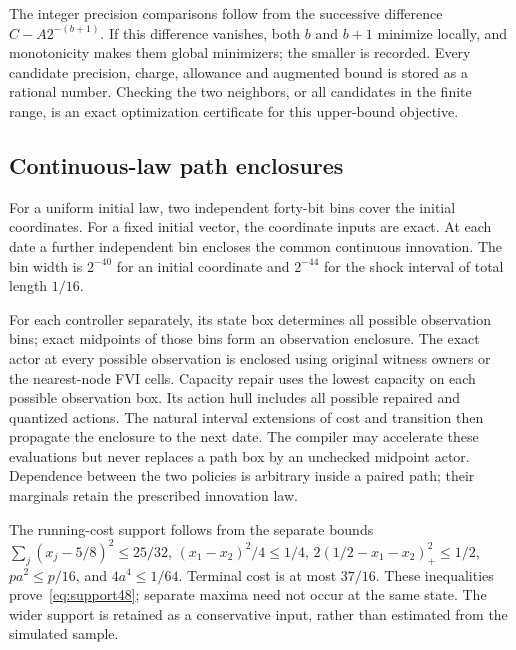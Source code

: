 The integer precision comparisons follow from the successive difference $C-A2^{-(b+1)}$. If this difference vanishes, both $b$ and $b+1$ minimize locally, and monotonicity makes them global minimizers; the smaller is recorded. Every candidate precision, charge, allowance and augmented bound is stored as a rational number. Checking the two neighbors, or all candidates in the finite range, is an exact optimization certificate for this upper-bound objective.

\subsection{Continuous-law path enclosures}
For a uniform initial law, two independent forty-bit bins cover the initial coordinates. For a fixed initial vector, the coordinate inputs are exact. At each date a further independent bin encloses the common continuous innovation. The bin width is $2^{-40}$ for an initial coordinate and $2^{-44}$ for the shock interval of total length $1/16$.

For each controller separately, its state box determines all possible observation bins; exact midpoints of those bins form an observation enclosure. The exact actor at every possible observation is enclosed using original witness owners or the nearest-node FVI cells. Capacity repair uses the lowest capacity on each possible observation box. Its action hull includes all possible repaired and quantized actions. The natural interval extensions of cost and transition then propagate the enclosure to the next date. The compiler may accelerate these evaluations but never replaces a path box by an unchecked midpoint actor. Dependence between the two policies is arbitrary inside a paired path; their marginals retain the prescribed innovation law.

The running-cost support follows from the separate bounds $\sum_j(x_j-5/8)^2\le25/32$, $(x_1-x_2)^2/4\le1/4$, $2(1/2-x_1-x_2)_+^2\le1/2$, $pa^2\le p/16$, and $4a^4\le1/64$. Terminal cost is at most $37/16$. These inequalities prove~\eqref{eq:support48}; separate maxima need not occur at the same state. The wider support is retained as a conservative input, rather than estimated from the simulated sample.

